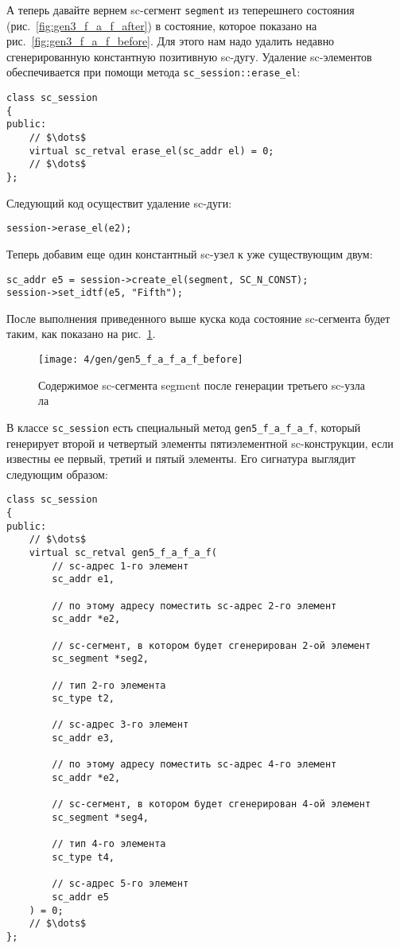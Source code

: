 А теперь давайте вернем sc-сегмент \lstinline|segment| из теперешнего
состояния (рис.~\ref{fig:gen3_f_a_f_after}) в состояние, которое
показано на рис.~\ref{fig:gen3_f_a_f_before}. Для этого нам надо
удалить недавно сгенерированную константную позитивную
sc-дугу. Удаление sc-элементов обеспечивается при помощи метода
\lstinline|sc_session::erase_el|:

\begin{lstlisting}[texcl]
class sc_session
{
public:
    // $\dots$
    virtual sc_retval erase_el(sc_addr el) = 0;
    // $\dots$
};
\end{lstlisting}

Следующий код осуществит удаление sc-дуги:

\begin{lstlisting}[texcl]
session->erase_el(e2);
\end{lstlisting}

Теперь добавим еще один константный sc-узел к уже существующим двум:

\begin{lstlisting}[texcl]
sc_addr e5 = session->create_el(segment, SC_N_CONST);
session->set_idtf(e5, "Fifth");
\end{lstlisting}

После выполнения приведенного выше куска кода состояние sc-сегмента
будет таким, как показано на рис.~\ref{fig:gen5_f_a_f_a_f_before}.

\begin{figure}[h!]
  \centering
  \texttt{[image: 4/gen/gen5\_f\_a\_f\_a\_f\_before]}
  \caption{Содержимое sc-сегмента segment после генерации третьего sc-узла ла}
  \label{fig:gen5_f_a_f_a_f_before}
\end{figure}

В классе \lstinline|sc_session| есть специальный метод
\lstinline|gen5_f_a_f_a_f|, который генерирует второй и четвертый
элементы пятиэлементной sc-конструкции, если известны ее первый,
третий и пятый элементы. Его сигнатура выглядит следующим образом:

\begin{lstlisting}[texcl]
class sc_session
{
public:
    // $\dots$
    virtual sc_retval gen5_f_a_f_a_f(
        // sc-адрес 1-го элемент
        sc_addr e1,

        // по этому адресу поместить sc-адрес 2-го элемент
        sc_addr *e2,

        // sc-сегмент, в котором будет сгенерирован 2-ой элемент
        sc_segment *seg2, 

        // тип 2-го элемента
        sc_type t2,

        // sc-адрес 3-го элемент
        sc_addr e3,

        // по этому адресу поместить sc-адрес 4-го элемент
        sc_addr *e2,

        // sc-сегмент, в котором будет сгенерирован 4-ой элемент
        sc_segment *seg4,

        // тип 4-го элемента
        sc_type t4,

        // sc-адрес 5-го элемент
        sc_addr e5
    ) = 0;
    // $\dots$
};
\end{lstlisting}

